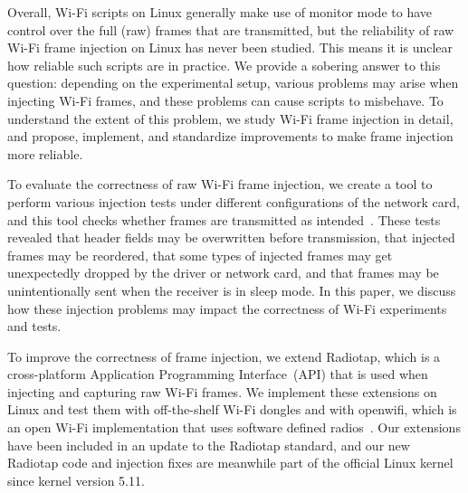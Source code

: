 \documentclass[sigconf]{acmart}
\newcommand{\wifi}{\mbox{Wi-Fi}}
\newcommand{\red}[1]{\textcolor{red}{#1}}
\begin{document}
Overall,
\wifi{} scripts on Linux generally make use of monitor mode to have control over the full (raw) frames that are transmitted,
but the reliability of raw \wifi{} frame injection on Linux has never been studied.
This means it is unclear how reliable such scripts are in practice.
We provide a sobering answer to this question: depending on the experimental setup, various problems may arise when injecting \wifi{} frames, and these problems can cause scripts to misbehave.
To understand the extent of this problem, we study \wifi{} frame injection in detail, and propose, implement, and standardize improvements to make frame injection more reliable.

To evaluate the correctness of raw \wifi{} frame injection, we create a tool to perform various injection tests under different configurations of the network card,
and this tool checks whether frames are transmitted as intended~\cite{repository}.
These tests revealed that header fields may be overwritten before transmission,
that injected frames may be reordered, that some types of injected frames may get unexpectedly dropped by the driver or network card, and that frames may be unintentionally sent when the receiver is in sleep mode.
In this paper,
we discuss how these injection problems may impact the correctness of \wifi{} experiments and tests.

To improve the correctness of frame injection,
we extend Radiotap, which is a cross-platform Application Programming Interface~(API) that is used when injecting and capturing raw \wifi{} frames.
We implement these extensions on Linux and test them with off-the-shelf \wifi{} dongles and with openwifi, which is an open \wifi{} implementation that uses software defined radios~\cite{jiao2020openwifi}.
Our extensions have been included in an update to the Radiotap standard,
and our new Radiotap code and injection fixes are meanwhile part of the official Linux kernel since kernel version 5.11.
\end{document}
